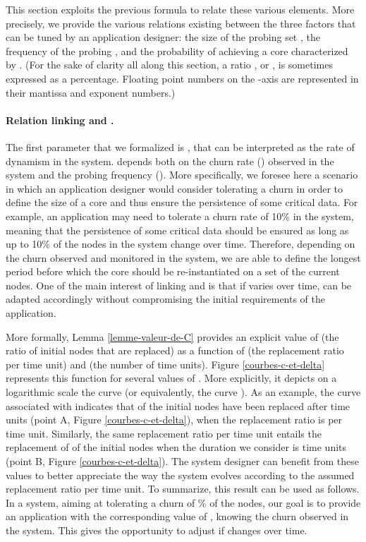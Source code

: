 \documentclass[]{llncs}
\begin{document}
This section  exploits  the previous  formula  to relate  these
various elements. More precisely, we 
provide the various  relations existing between the three  factors that can
be tuned by an application designer: 
the size of the probing set  , the frequency of the probing , and
the probability of achieving a core characterized by .
(For the sake of clarity all along this section, a ratio , or  ,
is sometimes expressed as a  percentage.  
Floating point numbers on the -axis are represented in 
their mantissa and exponent numbers.)


\paragraph{Relation linking  and .}

The first parameter that we formalized is , that can be interpreted as
 the rate of dynamism in the system.  
 depends  both  on the churn rate  () observed in the  system and the
 probing frequency  ().
More specifically, we foresee here a scenario in which an application designer
would consider tolerating a churn  in order to define 
the  size of   a core  and  thus ensure  the persistence  of some  critical
data. For example, an application may need to tolerate a churn rate of 10\%
in the system, meaning that the persistence of some critical data should be
ensured as  long as  up to  10\% of the  nodes in  the system  change  over
time.  Therefore, depending  on the  churn  observed and  monitored in  the
system, we are able to  define  the longest period  before which the
core  should be re-instantiated on a set of the current nodes.  One of  the
main   interest of  linking     and    is  that if    varies
over time,    can  be  adapted   accordingly without  compromising
the  initial requirements of the application.  

More formally, Lemma   \ref{lemme-valeur-de-C}  provides  an explicit value
of     (the  ratio   of  initial   nodes   that   are  replaced)   as  a
function  of    (the replacement ratio per time  unit) and  (the
number  of time  units).  Figure  \ref{courbes-c-et-delta}  represents this
function  for several  values of  . More  explicitly, it   depicts  on a
logarithmic  scale the curve  (or equivalently, the
curve  ).  
As an example, the  curve associated with   indicates that  
of the initial nodes have been replaced after   time
units (point A, Figure \ref{courbes-c-et-delta}), when the replacement ratio 
is  per time unit. 
Similarly, the same replacement ratio per time unit entails the replacement 
of    of  the  initial  nodes  when  the  duration  we  consider  is
  time  units (point B, Figure \ref{courbes-c-et-delta}).  
The system designer can benefit from these values to 
better appreciate the way the system evolves according to the assumed
replacement ratio per time unit.
To summarize, this result can be used as follows. In a system, 
aiming at tolerating a churn of \% of the nodes, our goal is to
provide an application with  the corresponding value of , 
knowing the churn    observed in the system.  This gives the opportunity
to adjust   if    changes over time.  
\end{document}
